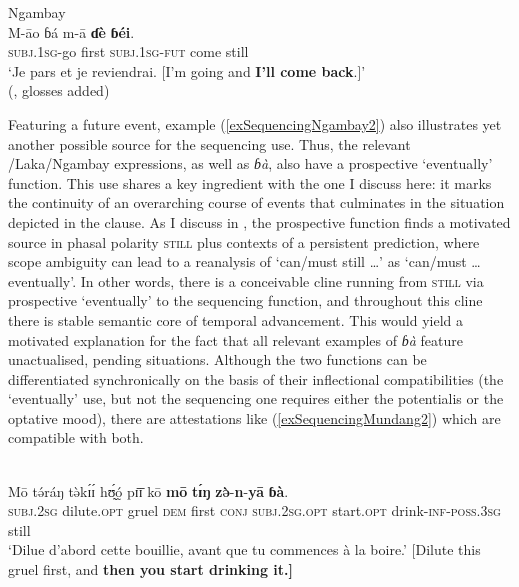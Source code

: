 \begin{exe}
	\ex Ngambay\label{exSequencingNgambay2}\\
	\gll M-āo ɓá m-ā \textbf{ɗè} \textbf{ɓéi}.\\
	\textsc{subj}.1\textsc{sg}-go first \textsc{subj}.1\textsc{sg}-\textsc{fut} come still\\
	\glt \lq Je pars et je reviendrai. [I'm going and \textbf{I'll come back}.]\rq{}\\(\cite[119]{Vandame1963}, glosses added)
\end{exe}

Featuring a future event, example (\ref{exSequencingNgambay2}) also illustrates yet another possible source for the sequencing use. Thus, the relevant /Laka/Ngambay expressions, as well as  \textit{ɓà}, also have a prospective \lq eventually\rq{ }function. This use shares a key ingredient with the one I discuss here: it marks the continuity of an overarching course of events that culminates in the situation depicted in the clause. As I discuss in , the prospective function finds a motivated source in phasal polarity \textsc{still} plus contexts of a persistent prediction, where scope ambiguity can lead to a reanalysis of \lq can/must still …\rq{ }as \lq can/must … eventually\rq{}. In other words, there is a conceivable cline running from \textsc{still} via prospective \lq eventually\rq{ }to the sequencing function, and throughout this cline there is stable semantic core of temporal advancement. This would yield a motivated explanation for the fact that all relevant examples of  \textit{ɓà} feature unactualised, pending situations. Although the two functions can be differentiated synchronically on the basis of their inflectional compatibilities (the \lq eventually\rq{ }use, but not the sequencing one requires either the potentialis or the optative mood), there are attestations like (\ref{exSequencingMundang2}) which are compatible with both.

\begin{exe}
	\ex {}\label{exSequencingMundang2}\\
	\gll Mō tə́ráŋ tə̀kɪ́ɪ́ hʊ̰́ó̰ pɪ̄ɪ̄ kō \textbf{mō} \textbf{tɪ́ŋ} \textbf{zə̀}-\textbf{n}-\textbf{yā} \textbf{ɓà}.\\
	\textsc{subj}.2\textsc{sg} dilute.\textsc{opt} gruel \textsc{dem} first \textsc{conj} \textsc{subj}.2\textsc{sg}.\textsc{opt} start.\textsc{opt} drink-\textsc{inf}-\textsc{poss}.3\textsc{sg} still\\
	\glt \lq Dilue d’abord cette bouillie, avant que tu commences à la boire.' [Dilute this gruel first, and \textbf{then you start drinking it.]} \parencite[384]{Elders2000}
\end{exe}


